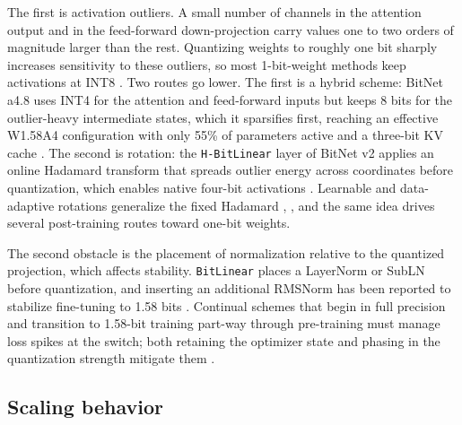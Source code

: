 \documentclass[11pt]{article}
\begin{document}
The first is activation outliers. A small number of channels in the attention output
and in the feed-forward down-projection carry values one to two orders of magnitude
larger than the rest. Quantizing weights to roughly one bit sharply increases
sensitivity to these outliers, so most 1-bit-weight methods keep activations at INT8
\cite{Ma2024-BitNetB158}. Two routes go lower. The first is a hybrid scheme: BitNet a4.8 uses
INT4 for the attention and feed-forward inputs but keeps 8 bits for the outlier-heavy
intermediate states, which it sparsifies first, reaching an effective W1.58A4
configuration with only 55\% of parameters active and a three-bit KV cache
\cite{Wang2024-BitNetA48}. The second is rotation: the \texttt{H-BitLinear} layer of BitNet v2
applies an online Hadamard transform that spreads outlier energy across coordinates
before quantization, which enables native four-bit activations \cite{Wang2025-BitNetV2}.
Learnable and data-adaptive rotations generalize the fixed Hadamard \cite{Zagitov2026-HARP},
\cite{Zhao2026-TWLA,Zhao2026-BWLA}, and the same idea drives several post-training routes
toward one-bit weights.

The second obstacle is the placement of normalization relative to the quantized
projection, which affects stability. \texttt{BitLinear} places a LayerNorm or SubLN before
quantization, and inserting an additional RMSNorm has been reported to stabilize
fine-tuning to 1.58 bits \cite{Steinmetz2025-ExtraRMSNorm}. Continual schemes that begin in
full precision and transition to 1.58-bit training part-way through pre-training must
manage loss spikes at the switch; both retaining the optimizer state and phasing in the
quantization strength mitigate them \cite{Nielsen2025-ContinualQAT}.

\subsection{Scaling behavior}
\end{document}
